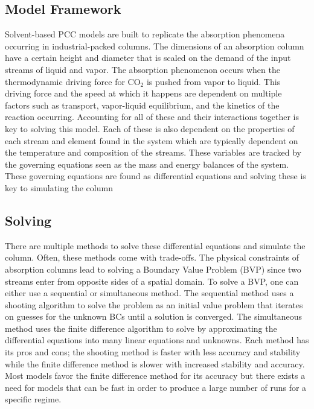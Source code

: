 \documentclass[12pt, letterpaper]{article}
\begin{document}
        \subsection{Model Framework}\label{subsec:model-framework}
            Solvent-based PCC models are built to replicate the absorption phenomena occurring in industrial-packed columns.
            The dimensions of an absorption column have a certain height and diameter that is scaled on the demand of the input streams of liquid and vapor.
            The absorption phenomenon occurs when the thermodynamic driving force for $\mathrm{CO}_2$ is pushed from vapor to liquid.
            This driving force and the speed at which it happens are dependent on multiple factors such as transport, vapor-liquid equilibrium, and the kinetics of the reaction occurring.
            Accounting for all of these and their interactions together is key to solving this model.
            Each of these is also dependent on the properties of each stream and element found in the system which are typically dependent on the temperature and composition of the streams.
            These variables are tracked by the governing equations seen as the mass and energy balances of the system.
            These governing equations are found as differential equations and solving these is key to simulating the column
    
        \subsection{Solving}\label{subsec:solving}
            There are multiple methods to solve these differential equations and simulate the column.
            Often, these methods come with trade-offs.
            The physical constraints of absorption columns lead to solving a Boundary Value Problem (BVP) since two streams enter from opposite sides of a spatial domain.
            To solve a BVP, one can either use a sequential or simultaneous method.
            The sequential method uses a shooting algorithm to solve the problem as an initial value problem that iterates on guesses for the unknown BCs until a solution is converged.
            The simultaneous method uses the finite difference algorithm to solve by approximating the differential equations into many linear equations and unknowns.
            Each method has its pros and cons; the shooting method is faster with less accuracy and stability while the finite difference method is slower with increased stability and accuracy.
            Most models favor the finite difference method for its accuracy but there exists a need for models that can be fast in order to produce a large number of runs for a specific regime.
    
\end{document}
